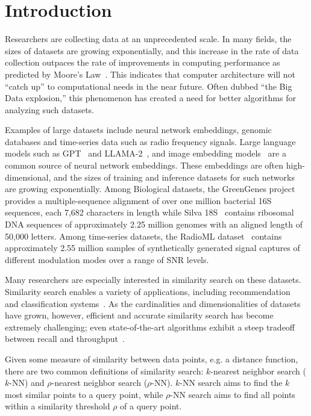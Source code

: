 \section{Introduction}
\label{sec:introduction}

Researchers are collecting data at an unprecedented scale.
In many fields, the sizes of datasets are growing exponentially, and this increase in the rate of data collection outpaces the rate of improvements in computing performance as predicted by Moore's Law~\cite{brescia2012extracting}.
This indicates that computer architecture will not ``catch up'' to computational needs in the near future.
Often dubbed ``the Big Data explosion,'' this phenomenon has created a need for better algorithms for analyzing such datasets.

Examples of large datasets include neural network embeddings, genomic databases and time-series data such as radio frequency signals.
Large language models such as GPT~\cite{2020arXiv200514165B, OpenAI2023GPT4TR} and LLAMA-2~\cite{Touvron2023Llama2O}, and image embedding models~\cite{radford2021learning, dosovitskiy2020image} are a common source of neural network embeddings.
These embeddings are often high-dimensional, and the sizes of training and inference datasets for such networks are growing exponentially.
Among Biological datasets, the GreenGenes project~\cite{desantis2006greengenes} provides a multiple-sequence alignment of over one million bacterial 16S sequences, each 7,682 characters in length while Silva 18S~\cite{10.1093/nar/gks1219} contains ribosomal DNA sequences of approximately 2.25 million genomes with an aligned length of 50,000 letters.
Among time-series datasets, the RadioML dataset~\cite{oshea2018radioml} contains approximately 2.55 million samples of synthetically generated signal captures of different modulation modes over a range of SNR levels.

Many researchers are especially interested in similarity search on these datasets. 
Similarity search enables a variety of applications, including recommendation~\cite{annoy} and classification systems~\cite{suyanto2022knnclassifier}. 
As the cardinalities and dimensionalities of datasets have grown, however, efficient and accurate similarity search has become extremely challenging; 
even state-of-the-art algorithms exhibit a steep tradeoff between recall and throughput~\cite{Malkov2016EfficientAR, johnson2019billion, annoy, aumuller2020ann}.

Given some measure of similarity between data points, e.g. a distance function, there are two common definitions of similarity search: $k$-nearest neighbor search ($k$-NN) and $\rho$-nearest neighbor search ($\rho$-NN).
$k$-NN search aims to find the $k$ most similar points to a query point, while $\rho$-NN search aims to find all points within a similarity threshold $\rho$ of a query point.

